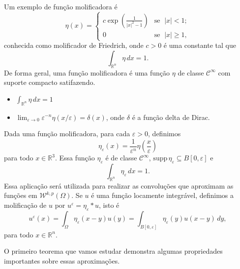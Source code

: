 \documentclass[a4paper, 11pt]{book}
\theoremstyle{definition}
\newcommand{\bR}{\mathbb{R}}
\newcommand{\cC}{\mathcal{C}}
\newcommand{\cW}{\mathcal{W}}
\newcommand{\supp}{\mathrm{supp}\,}
\begin{document}
Um exemplo de função molificadora é
\begin{equation} \label{eq:molificador-friedrich}
    \eta(x) =
    \left\{
        \begin{array}{lr}
            c \exp \left( \frac{1}{|x|^2 - 1} \right) & \text{se }\; |x| < 1;\\
            0 & \text{se }\; |x| \geqslant 1,
        \end{array}
    \right.
\end{equation}
conhecida como molificador de Friedrich, onde $c > 0$ é uma constante tal que
\[
    \int_{\bR^n} \eta \,dx = 1.
\]
De forma geral, uma função molificadora é uma função $\eta$ de classe $\cC^\infty$ com suporte compacto satifazendo. 
\begin{itemize}[leftmargin=*]
    \item $\displaystyle \int_{\bR^n} \eta \,dx = 1$
    \item $\displaystyle \lim_{\varepsilon \to 0} \varepsilon^{-n}\eta(x/\varepsilon) = \delta(x)$, onde $\delta$ é a função delta de Dirac.
\end{itemize}
Dada uma função molificadora, para cada $\varepsilon > 0$, definimos
\begin{equation} \label{eq:eta-epsilon}
    \eta_\varepsilon(x) = \frac{1}{\varepsilon^n} \eta\left( \frac{x}{\varepsilon} \right)
\end{equation}
para todo $x \in \bR^3$. Essa função $\eta_\varepsilon$ é de classe $\cC^\infty$, $\supp \eta_\varepsilon \subseteq B[0,\varepsilon]$ e
\[
    \int_{\bR^n} \eta_\varepsilon \,dx = 1.
\]
Essa aplicação será utilizada para realizar as convoluções que aproximam as funções em $\cW^{k,p}(\Omega)$. Se $u$ é uma função locamente integrável, definimos a molificação de $u$ por $u^\varepsilon = \eta_\varepsilon * u$, isto é
\[
    u^\varepsilon(x) = \int_\Omega \eta_\varepsilon(x-y) u(y) = \int_{B[0,\varepsilon]} \eta_\varepsilon(y) u(x-y) \,dy,
\]
para todo $x \in \bR^n$.

O primeiro teorema que vamos estudar demonstra algumas propriedades importantes sobre essas aproximações.
\end{document}
